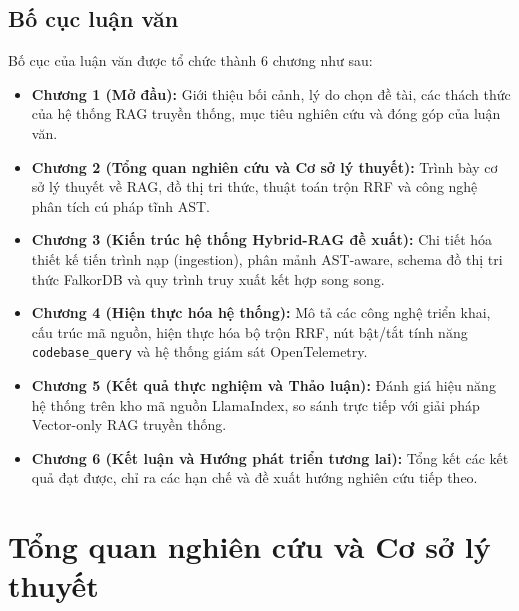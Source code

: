 \documentclass[12pt,a4paper,oneside]{report}
\begin{document}
\section{Bố cục luận văn}
Bố cục của luận văn được tổ chức thành 6 chương như sau:
\begin{itemize}
    \item \textbf{Chương 1 (Mở đầu):} Giới thiệu bối cảnh, lý do chọn đề tài, các thách thức của hệ thống RAG truyền thống, mục tiêu nghiên cứu và đóng góp của luận văn.
    \item \textbf{Chương 2 (Tổng quan nghiên cứu và Cơ sở lý thuyết):} Trình bày cơ sở lý thuyết về RAG, đồ thị tri thức, thuật toán trộn RRF và công nghệ phân tích cú pháp tĩnh AST.
    \item \textbf{Chương 3 (Kiến trúc hệ thống Hybrid-RAG đề xuất):} Chi tiết hóa thiết kế tiến trình nạp (ingestion), phân mảnh AST-aware, schema đồ thị tri thức FalkorDB và quy trình truy xuất kết hợp song song.
    \item \textbf{Chương 4 (Hiện thực hóa hệ thống):} Mô tả các công nghệ triển khai, cấu trúc mã nguồn, hiện thực hóa bộ trộn RRF, nút bật/tắt tính năng \texttt{codebase\_query} và hệ thống giám sát OpenTelemetry.
    \item \textbf{Chương 5 (Kết quả thực nghiệm và Thảo luận):} Đánh giá hiệu năng hệ thống trên kho mã nguồn LlamaIndex, so sánh trực tiếp với giải pháp Vector-only RAG truyền thống.
    \item \textbf{Chương 6 (Kết luận và Hướng phát triển tương lai):} Tổng kết các kết quả đạt được, chỉ ra các hạn chế và đề xuất hướng nghiên cứu tiếp theo.
\end{itemize}

\newpage

\chapter{Tổng quan nghiên cứu và Cơ sở lý thuyết}
\end{document}
